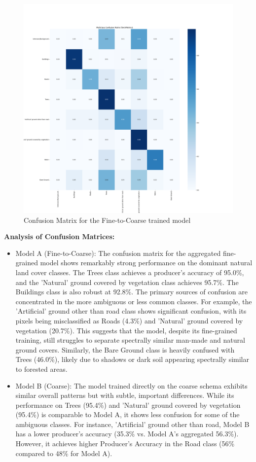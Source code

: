 \documentclass{report}
\begin{document}
\begin{figure}
    \centering
    \includegraphics[width=0.7\linewidth]{own_images/fine_to_coarse_confusion_matrix_SegFormer_mit_b3_20250628_203226.png}
    \caption{Confusion Matrix for the Fine-to-Coarse trained model}
    \label{fig:con_mat_fine_coarse}
\end{figure}
\par
\textbf{Analysis of Confusion Matrices:}
\begin{itemize}
    \item Model A (Fine-to-Coarse): The confusion matrix for the aggregated fine-grained model shows remarkably strong performance on the dominant natural land cover classes. The Trees class achieves a producer's accuracy of 95.0\%, and the 'Natural' ground covered by vegetation class achieves 95.7\%. The Buildings class is also robust at 92.8\%. The primary sources of confusion are concentrated in the more ambiguous or less common classes. For example, the 'Artificial' ground other than road class shows significant confusion, with its pixels being misclassified as Roads (4.3\%) and 'Natural' ground covered by vegetation (20.7\%). This suggests that the model, despite its fine-grained training, still struggles to separate spectrally similar man-made and natural ground covers. Similarly, the Bare Ground class is heavily confused with Trees (46.0\%), likely due to shadows or dark soil appearing spectrally similar to forested areas.
    \item Model B (Coarse): The model trained directly on the coarse schema exhibits similar overall patterns but with subtle, important differences. While its performance on Trees (95.4\%) and 'Natural' ground covered by vegetation (95.4\%) is comparable to Model A, it shows less confusion for some of the ambiguous classes. For instance, 'Artificial' ground other than road, Model B  has a lower producer's accuracy (35.3\% vs. Model A's aggregated 56.3\%). However, it achieves higher Producer's Accuracy in the Road class (56\% compared to 48\% for Model A).
\end{itemize}
\end{document}
